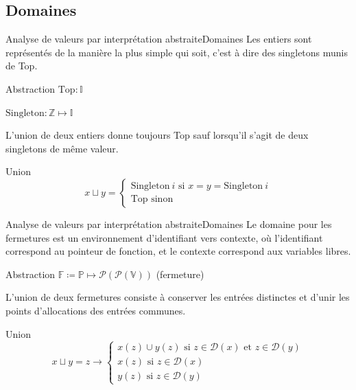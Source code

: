 \documentclass{beamer}
\begin{document}
\subsection{Domaines}

\begin{frame}{Analyse de valeurs par interprétation abstraite}{Domaines}
    Les entiers sont représentés de la manière la plus simple qui soit, c'est à dire des singletons munis de Top.
    
    \begin{block}{Abstraction}
        $\text{Top} : \mathbb{I}$

        $\text{Singleton} : \mathbb{Z} \mapsto \mathbb{I}$
    \end{block}

    L'union de deux entiers donne toujours Top sauf lorsqu'il s'agit de deux singletons de même valeur.

    \begin{block}{Union}
        $$
        x \sqcup y =
        \begin{cases}
            \text{Singleton} ~ i \text{ si } x = y = \text{Singleton} ~ i  \\
            \text{Top} \text{ sinon}
        \end{cases}
        $$
    \end{block}
\end{frame}

\begin{frame}{Analyse de valeurs par interprétation abstraite}{Domaines}
    Le domaine pour les fermetures est un environnement d'identifiant vers contexte, où l'identifiant correspond au pointeur de fonction, et le contexte correspond aux variables libres.
    \begin{block}{Abstraction}
        $\mathbb{F} \coloneqq \mathbb{P} \mapsto \mathcal{P}(\mathcal{P}(\mathbb{V}))$ (fermeture)
    \end{block}

    L'union de deux fermetures consiste à conserver les entrées distinctes et d'unir les points d'allocations des entrées communes.%
    
    \begin{block}{Union}
        $$
        x \sqcup y = z \rightarrow
        \begin{cases}
            x(z) \cup y(z) \text{ si } z \in \mathcal{D}(x) \text{ et } z \in \mathcal{D}(y) \\
            x(z) \text{ si } z \in \mathcal{D}(x) \\
            y(z) \text{ si } z \in \mathcal{D}(y)
        \end{cases}
        $$
    \end{block}
\end{frame}
\end{document}
